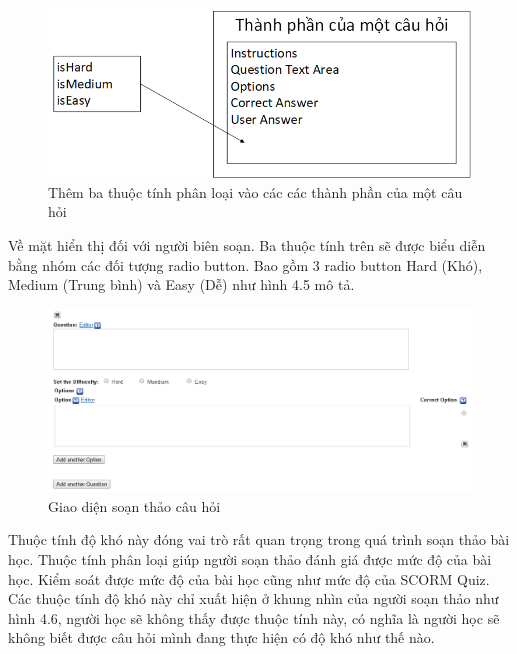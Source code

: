 	\begin{center}
	\begin{figure}[htp]
		\begin{center}
			\includegraphics[width=15cm]{Chapter4/Pictures/picture44.png}
		\end{center}
		\caption{Thêm ba thuộc tính phân loại vào các các thành phần của một câu hỏi}
		\label{refpicture51}
	\end{figure}
\end{center}

Về mặt hiển thị đối với người biên soạn. Ba thuộc tính trên sẽ được biểu diễn bằng nhóm các đối tượng radio button. Bao gồm 3 radio button Hard (Khó), Medium (Trung bình) và Easy (Dễ) như hình 4.5 mô tả.

\newpage
	\begin{center}
	\begin{figure}[htp]
		\begin{center}
			\includegraphics[width=15cm]{Chapter4/Pictures/picture45.png}
		\end{center}
		\caption{Giao diện soạn thảo câu hỏi}
		\label{refpicture51}
	\end{figure}
\end{center}


	Thuộc tính độ khó này đóng vai trò rất quan trọng trong quá trình soạn thảo bài học. Thuộc tính phân loại giúp người soạn thảo đánh giá được mức độ của bài học. Kiểm soát được mức độ của bài học cũng như mức độ của SCORM Quiz. Các thuộc tính độ khó này chỉ xuất hiện ở khung nhìn của người soạn thảo như hình 4.6, người học sẽ không thấy được thuộc tính này, có nghĩa là người học sẽ không biết được câu hỏi mình đang thực hiện có độ khó như thế nào.
	
